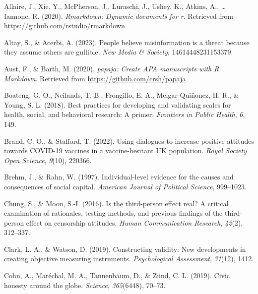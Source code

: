 \documentclass[
  ,jou,floatsintext]{apa6}
\newlength{\cslhangindent}
\newlength{\cslentryspacingunit} %
\newenvironment{CSLReferences}[2] %
 {%
  \setlength{\parindent}{0pt}
  \ifodd #1
  \let\oldpar\par
  \def\par{\hangindent=\cslhangindent\oldpar}
  \fi
  \setlength{\parskip}{#2\cslentryspacingunit}
 }%
 {}
\begin{document}
\hypertarget{refs}{}
\begin{CSLReferences}{1}{0}
\leavevmode{}%
Allaire, J., Xie, Y., McPherson, J., Luraschi, J., Ushey, K., Atkins, A., \ldots{} Iannone, R. (2020). \emph{Rmarkdown: Dynamic documents for r}. Retrieved from \url{https://github.com/rstudio/rmarkdown}

\leavevmode{}%
Altay, S., \& Acerbi, A. (2023). People believe misinformation is a threat because they assume others are gullible. \emph{New Media \& Society}, 14614448231153379.

\leavevmode{}%
Aust, F., \& Barth, M. (2020). \emph{{papaja}: {Create} {APA} manuscripts with {R Markdown}}. Retrieved from \url{https://github.com/crsh/papaja}

\leavevmode{}%
Boateng, G. O., Neilands, T. B., Frongillo, E. A., Melgar-Quiñonez, H. R., \& Young, S. L. (2018). Best practices for developing and validating scales for health, social, and behavioral research: A primer. \emph{Frontiers in Public Health}, \emph{6}, 149.

\leavevmode{}%
Brand, C. O., \& Stafford, T. (2022). Using dialogues to increase positive attitudes towards COVID-19 vaccines in a vaccine-hesitant UK population. \emph{Royal Society Open Science}, \emph{9}(10), 220366.

\leavevmode{}%
Brehm, J., \& Rahn, W. (1997). Individual-level evidence for the causes and consequences of social capital. \emph{American Journal of Political Science}, 999--1023.

\leavevmode{}%
Chung, S., \& Moon, S.-I. (2016). Is the third-person effect real? A critical examination of rationales, testing methods, and previous findings of the third-person effect on censorship attitudes. \emph{Human Communication Research}, \emph{42}(2), 312--337.

\leavevmode{}%
Clark, L. A., \& Watson, D. (2019). Constructing validity: New developments in creating objective measuring instruments. \emph{Psychological Assessment}, \emph{31}(12), 1412.

\leavevmode{}%
Cohn, A., Maréchal, M. A., Tannenbaum, D., \& Zünd, C. L. (2019). Civic honesty around the globe. \emph{Science}, \emph{365}(6448), 70--73.


\end{CSLReferences}
\end{document}

